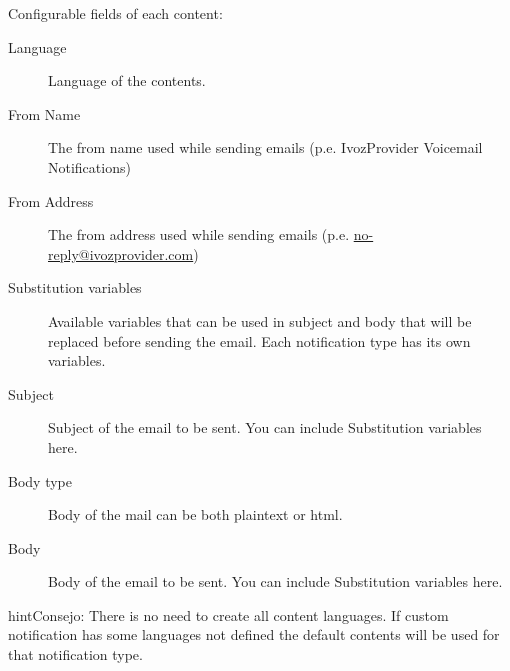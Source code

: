 \documentclass[letterpaper,10pt,spanish]{sphinxmanual}
\begin{document}
Configurable fields of each content:
\begin{description}
\item[{Language}] \leavevmode{}\label{administration_portal/brand/settings/notification_templates:term-language}
Language of the contents.

\item[{From Name}] \leavevmode{}\label{administration_portal/brand/settings/notification_templates:term-from-name}
The from name used while sending emails (p.e. IvozProvider Voicemail Notifications)

\item[{From Address}] \leavevmode{}\label{administration_portal/brand/settings/notification_templates:term-from-address}
The from address used while sending emails (p.e. \href{mailto:no-reply@ivozprovider.com}{no-reply@ivozprovider.com})

\item[{Substitution variables}] \leavevmode{}\label{administration_portal/brand/settings/notification_templates:term-substitution-variables}
Available variables that can be used in subject and body that will be replaced before sending the email. Each
notification type has its own variables.

\item[{Subject}] \leavevmode{}\label{administration_portal/brand/settings/notification_templates:term-subject}
Subject of the email to be sent. You can include Substitution variables here.

\item[{Body type}] \leavevmode{}\label{administration_portal/brand/settings/notification_templates:term-body-type}
Body of the mail can be both plaintext or html.

\item[{Body}] \leavevmode{}\label{administration_portal/brand/settings/notification_templates:term-body}
Body of the email to be sent. You can include Substitution variables here.

\end{description}

\begin{notice}{hint}{Consejo:}
There is no need to create all content languages. If custom notification has some languages not defined the
default contents will be used for that notification type.
\end{notice}
\end{document}
